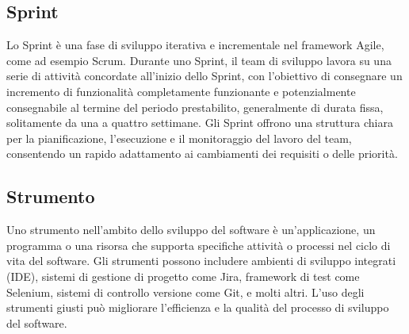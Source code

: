 \subsection{Sprint} 
Lo Sprint è una fase di sviluppo iterativa e incrementale nel framework Agile, come ad esempio Scrum. Durante uno Sprint, il team di sviluppo lavora su una serie di attività concordate all'inizio dello Sprint, con l'obiettivo di consegnare un incremento di funzionalità completamente funzionante e potenzialmente consegnabile al termine del periodo prestabilito, generalmente di durata fissa, solitamente da una a quattro settimane. Gli Sprint offrono una struttura chiara per la pianificazione, l'esecuzione e il monitoraggio del lavoro del team, consentendo un rapido adattamento ai cambiamenti dei requisiti o delle priorità. 
\subsection{Strumento} 
Uno strumento nell'ambito dello sviluppo del software è un'applicazione, un programma o una risorsa che supporta specifiche attività o processi nel ciclo di vita del software. Gli strumenti possono includere ambienti di sviluppo integrati (IDE), sistemi di gestione di progetto come Jira, framework di test come Selenium, sistemi di controllo versione come Git, e molti altri. L'uso degli strumenti giusti può migliorare l'efficienza e la qualità del processo di sviluppo del software. 
